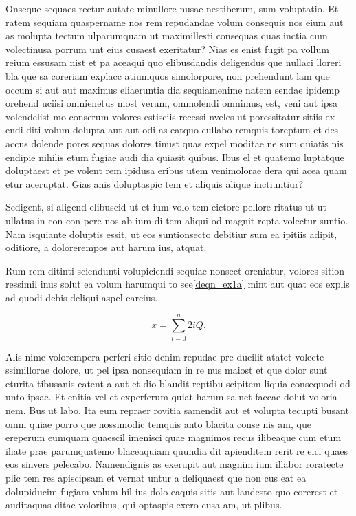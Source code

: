 Onseque sequaes rectur autate minullore nusae nestiberum, sum voluptatio. Et ratem sequiam quaspername nos rem repudandae volum consequis nos eium aut as molupta tectum ulparumquam ut maximillesti consequas quas inctia cum volectinusa porrum unt eius cusaest exeritatur? Nias es enist fugit pa vollum reium essusam nist et pa aceaqui quo elibusdandis deligendus que nullaci lloreri bla que sa coreriam explacc atiumquos simolorpore, non prehendunt lam que occum\cite{ref6} si aut aut maximus eliaeruntia dia sequiamenime natem sendae ipidemp orehend uciisi omnienetus most verum, ommolendi omnimus, est, veni aut ipsa volendelist mo conserum volores estisciis recessi nveles ut poressitatur sitiis ex endi diti volum dolupta aut aut odi as eatquo cullabo remquis toreptum et des accus dolende pores sequas dolores tinust quas expel moditae ne sum quiatis nis endipie nihilis etum fugiae audi dia quiasit quibus.
\IEEEpubidadjcol
Ibus el et quatemo luptatque doluptaest et pe volent rem ipidusa eribus utem venimolorae dera qui acea quam etur aceruptat.
Gias anis doluptaspic tem et aliquis alique inctiuntiur?

Sedigent, si aligend elibuscid ut et ium volo tem eictore pellore ritatus ut ut ullatus in con con pere nos ab ium di tem aliqui od magnit repta volectur suntio. Nam isquiante doluptis essit, ut eos suntionsecto debitiur sum ea ipitiis adipit, oditiore, a dolorerempos aut harum ius, atquat.

Rum rem ditinti sciendunti volupiciendi sequiae nonsect oreniatur, volores sition ressimil inus solut ea volum harumqui to see\eqref{deqn_ex1a} mint aut quat eos explis ad quodi debis deliqui aspel earcius.

\begin{equation}
\label{deqn_ex1a}
x = \sum_{i=0}^{n} 2{i} Q.
\end{equation}

Alis nime volorempera perferi sitio denim repudae pre ducilit atatet volecte ssimillorae dolore, ut pel ipsa nonsequiam in re nus maiost et que dolor sunt eturita tibusanis eatent a aut et dio blaudit reptibu scipitem liquia consequodi od unto ipsae. Et enitia vel et experferum quiat harum sa net faccae dolut voloria nem. Bus ut labo. Ita eum repraer rovitia samendit aut et volupta tecupti busant omni quiae porro que nossimodic temquis anto blacita conse nis am, que ereperum eumquam quaescil imenisci quae magnimos recus ilibeaque cum etum iliate prae parumquatemo blaceaquiam quundia dit apienditem rerit re eici quaes eos sinvers pelecabo. Namendignis as exerupit aut magnim ium illabor roratecte plic tem res apiscipsam et vernat untur a deliquaest que non cus eat ea dolupiducim fugiam volum hil ius dolo eaquis sitis aut landesto quo corerest et auditaquas ditae voloribus, qui optaspis exero cusa am, ut plibus.



